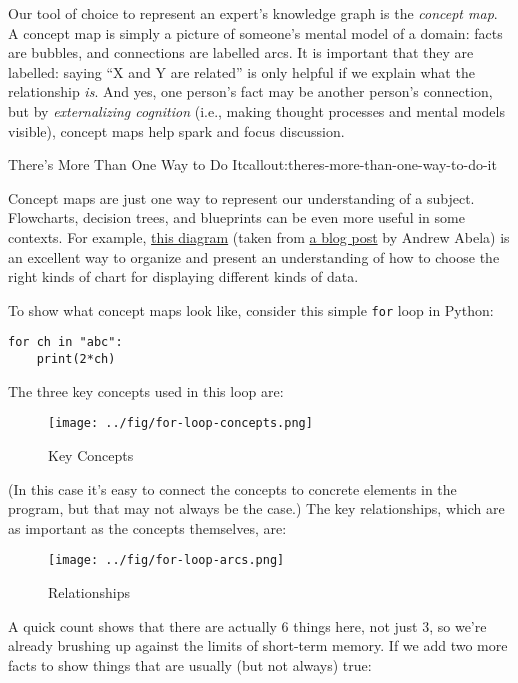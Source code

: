 Our tool of choice to represent an expert's knowledge graph is the
\emph{concept map}. A concept map is simply a picture of someone's
mental model of a domain: facts are bubbles, and connections are
labelled arcs. It is important that they are labelled: saying ``X and Y
are related'' is only helpful if we explain what the relationship
\emph{is}. And yes, one person's fact may be another person's
connection, but by \emph{externalizing cognition} (i.e., making thought
processes and mental models visible), concept maps help spark and focus
discussion.

\begin{callout}{There's More Than One Way to Do It}{callout:theres-more-than-one-way-to-do-it}

Concept maps are just one way to represent our understanding of a
subject. Flowcharts, decision trees, and blueprints can be even more
useful in some contexts. For example,
\href{fixme-abela}{this diagram}
(taken from \href{http://extremepresentation.typepad.com/blog/2006/09/choosing\_a\_good.html}{a blog post}
by Andrew Abela) is an excellent way to organize and present
an understanding of how to choose the right kinds of chart for
displaying different kinds of data.
\end{callout}

To show what concept maps look like, consider this simple \texttt{for}
loop in Python:

\begin{verbatim}
for ch in "abc":
    print(2*ch)
\end{verbatim}

The three key concepts used in this loop are:

\begin{figure}[htbp]
\centering
\texttt{[image: ../fig/for-loop-concepts.png]}
\caption{Key Concepts}
\end{figure}

(In this case it's easy to connect the concepts to concrete elements in
the program, but that may not always be the case.) The key
relationships, which are as important as the concepts themselves, are:

\begin{figure}[htbp]
\centering
\texttt{[image: ../fig/for-loop-arcs.png]}
\caption{Relationships}
\end{figure}

A quick count shows that there are actually 6 things here, not just 3,
so we're already brushing up against the limits of short-term memory. If
we add two more facts to show things that are usually (but not always)
true:

